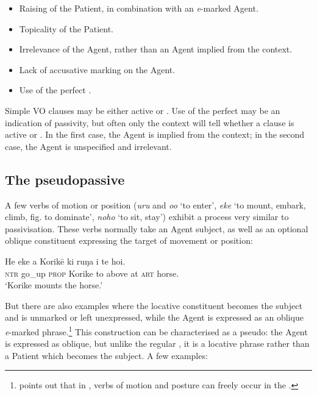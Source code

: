 \begin{itemize}
\item 
Raising of the Patient, in combination with an \textit{e}{}-marked Agent.

\item 
Topicality of the Patient.

\item 
Irrelevance of the Agent, rather than an Agent implied from the context.

\item 
Lack of accusative marking on the Agent.

\item 
Use of the perfect . 

\end{itemize}

Simple VO clauses may be either active or . Use of the perfect  may be an indication of passivity, but often only the context will tell whether a clause is active or . In the first case, the Agent is implied from the context; in the second case, the Agent is unspecified and irrelevant.

\subsection{The pseudopassive}\label{sec:8.5.2}
A few  verbs of motion or position (\textit{uru} and \textit{o{\ꞌ}o} ‘to enter’, \textit{eke} ‘to mount, embark, climb, fig. to dominate’, \textit{noho} ‘to sit, stay’) exhibit a process very similar to passivisation. These verbs normally take an Agent subject, as well as an optional oblique constituent expressing the target of movement or position:

\ea\label{ex:8.59}
\gll He eke a Korikē ki ruŋa i te hoi.\\
\textsc{ntr} go\_up \textsc{prop} Korike to above at \textsc{art} horse.\\

\glt
‘Korike mounts the horse.’ \textstyleExampleref{[R616.059]} 
\z

But there are also examples where the locative constituent becomes the subject and is unmarked or left unexpressed, while the Agent is expressed as an oblique \textit{e}{}-marked phrase.\footnote{\label{fn:416}\citet[40]{Hooper1984Neuter} points out that in , verbs of motion and posture can freely occur in the .} This construction can be characterised as a pseudo: the Agent is expressed as oblique, but unlike the regular , it is a locative phrase rather than a Patient which becomes the subject. A few examples:

